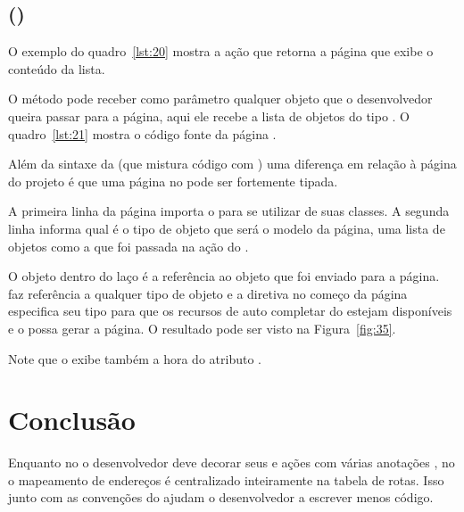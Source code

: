 \subsection{ ()}

O exemplo do quadro~\ref{lst:20} mostra a ação que retorna a página que exibe o conteúdo da lista.


O método  pode receber como parâmetro qualquer objeto que o desenvolvedor queira passar para a página, aqui ele recebe a lista de objetos do tipo . O quadro~\ref{lst:21} mostra o código fonte da página .


Além da sintaxe da  (que mistura código  com ) uma diferença em relação à página do projeto  é que uma página no  pode ser fortemente tipada.

A primeira linha da página importa o   para se utilizar de suas classes. A segunda linha informa qual é o tipo de objeto que será o modelo da página, uma lista de objetos  como a que foi passada na ação do .

O objeto  dentro do laço  é a referência ao objeto que foi enviado para a página.  faz referência a qualquer tipo de objeto e a diretiva  no começo da página especifica seu tipo para que os recursos de auto completar do  estejam disponíveis e o  possa gerar a página. O resultado pode ser visto na Figura~\ref{fig:35}.


Note que o  exibe também a hora do atributo .

\section{Conclusão}

Enquanto no  o desenvolvedor deve decorar seus  e ações com várias anotações , no  o mapeamento de endereços é centralizado inteiramente na tabela de rotas. Isso junto com as convenções do  ajudam o desenvolvedor a escrever menos código.

